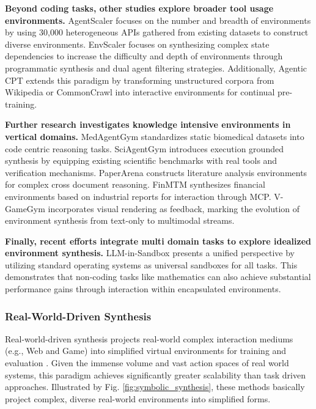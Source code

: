 \textbf{Beyond coding tasks, other studies explore broader tool usage environments.} AgentScaler \cite{AgentScaler} focuses on the number and breadth of environments by using 30,000 heterogeneous APIs gathered from existing datasets to construct diverse environments. EnvScaler \cite{EnvScaler} focuses on synthesizing complex state dependencies to increase the difficulty and depth of environments through programmatic synthesis and dual agent filtering strategies. Additionally, Agentic CPT \cite{Agent_CPT} extends this paradigm by transforming unstructured corpora from Wikipedia or CommonCrawl into interactive environments for continual pre-training.

\textbf{Further research investigates knowledge intensive environments in vertical domains.} MedAgentGym \cite{MedAgentGym} standardizes static biomedical datasets into code centric reasoning tasks. SciAgentGym \cite{SciAgentGym} introduces execution grounded synthesis by equipping existing scientific benchmarks with real tools and verification mechanisms. PaperArena \cite{PaperArena} constructs literature analysis environments for complex cross document reasoning. FinMTM \cite{FinMTM} synthesizes financial environments based on industrial reports for interaction through MCP. V-GameGym \cite{V-GameGym} incorporates visual rendering as feedback, marking the evolution of environment synthesis from text-only to multimodal streams. 

\textbf{Finally, recent efforts integrate multi domain tasks to explore idealized environment synthesis.} LLM-in-Sandbox \cite{LLM-in-Sandbox} presents a unified perspective by utilizing standard operating systems as universal sandboxes for all tasks. This demonstrates that non-coding tasks like mathematics can also achieve substantial performance gains through interaction within encapsulated environments.

\subsubsection{Real-World-Driven Synthesis}
\label{sec:real world driven synthesis}

Real-world-driven synthesis projects real-world complex interaction mediums (e.g., Web and Game) into simplified virtual environments for training and evaluation \cite{AgentSynth, AI_GAMESTORE, LMGAME-BENCH, GameDevBench, VeriEnv, AutoWebWorld, GLM-5, MiMo-V2-Flash, DIVE, KAT-Coder-V2}. Given the immense volume and vast action spaces of real world systems, this paradigm achieves significantly greater scalability than task driven approaches. Illustrated by Fig. \ref{fig:symbolic_synthesis}, these methods basically project complex, diverse real-world environments into simplified forms.


